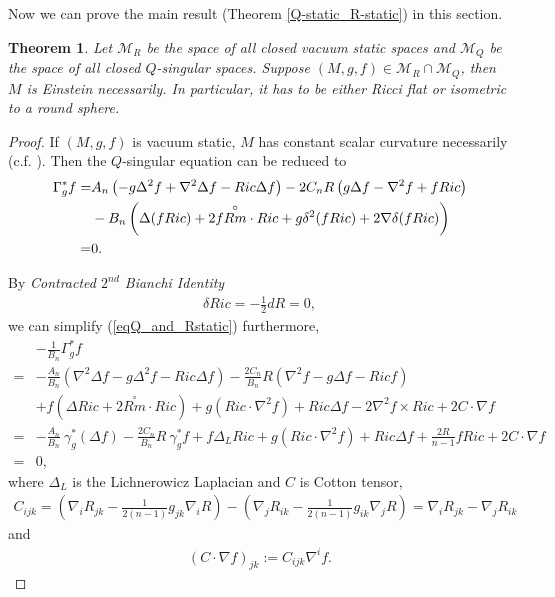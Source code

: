 \documentclass[12pt]{amsart}
\newtheorem{theorem}{Theorem}[section]
\theoremstyle{definition}
\theoremstyle{remark}
\numberwithin{equation}{section}
\begin{document}
Now we can prove the main result (Theorem \ref{Q-static_R-static}) in this section.

\begin{theorem}
Let $\mathcal{M}_R$ be the space of all closed vacuum static spaces and $\mathcal{M}_Q$ be the space of all closed $Q$-singular spaces. 
Suppose $(M, g, f) \in \mathcal{M}_R \cap \mathcal{M}_Q$, then $M$ is Einstein necessarily. In particular, it has to be either Ricci flat or isometric to a round sphere.
\end{theorem}
\begin{proof}
If $(M,g,f)$ is vacuum static, $M$ has constant scalar curvature necessarily (c.f. \cite{F-M}). Then the $Q$-singular equation can be reduced to
\begin{align}\label{eqQ_and_Rstatic}
\Gamma_g^* f =& A_n \left( - g \Delta^2 f + \nabla^2
\Delta f - Ric \Delta f \right)- 2 C_n R \left( g\Delta f - \nabla^2 f + f
Ric \right)\\
&\notag - B_n \left( \Delta (f Ric) + 2 f
\overset{\circ}{Rm}\cdot Ric + g \delta^2 (f Ric) + 2 \nabla \delta (f
Ric) \right)\\ =&
\notag 0.
\end{align}

By \emph{Contracted $2^{nd}$ Bianchi Identity}
\begin{align*}
\delta Ric = - \frac{1}{2} dR = 0,
\end{align*}
we can simplify (\ref{eqQ_and_Rstatic}) furthermore,
\begin{align*}
&-\frac{1}{B_n}\Gamma_g^* f \\
=& -\frac{A_n}{B_n} \left( \nabla^2 \Delta f - g \Delta^2 f - Ric \Delta f \right) - \frac{2C_n}{B_n}R \left( \nabla^2 f - g \Delta f - Ric f \right) \\ &+ f (\Delta Ric + 2 \overset\circ{Rm} \cdot Ric) + g (Ric \cdot \nabla^2 f) + Ric \Delta f - 2 \nabla^2 f \times Ric + 2 C \cdot \nabla f\\
=& -\frac{A_n}{B_n}\ \gamma_g^* (\Delta f) - \frac{2C_n}{B_n}R\ \gamma_g^* f + f \Delta_L Ric + g (Ric \cdot \nabla^2 f)  + Ric \Delta f  +\frac{2 R }{n-1}f Ric + 2 C \cdot \nabla f\\
=& 0,
\end{align*}
where $\Delta_L$ is the Lichnerowicz Laplacian and $C$ is Cotton tensor,
\begin{align*}
C_{ijk} = \left( \nabla_i R_{jk} - \frac{1}{2(n-1)}g_{jk}\nabla_i R\right) - \left( \nabla_j R_{ik} - \frac{1}{2(n-1)}g_{ik} \nabla_j R \right) = \nabla_i R_{jk} - \nabla_j R_{ik}
\end{align*}
and
\begin{align*}
(C \cdot \nabla f)_{jk} := C_{ijk} \nabla^i f.
\end{align*}


\end{proof}
\end{document}
